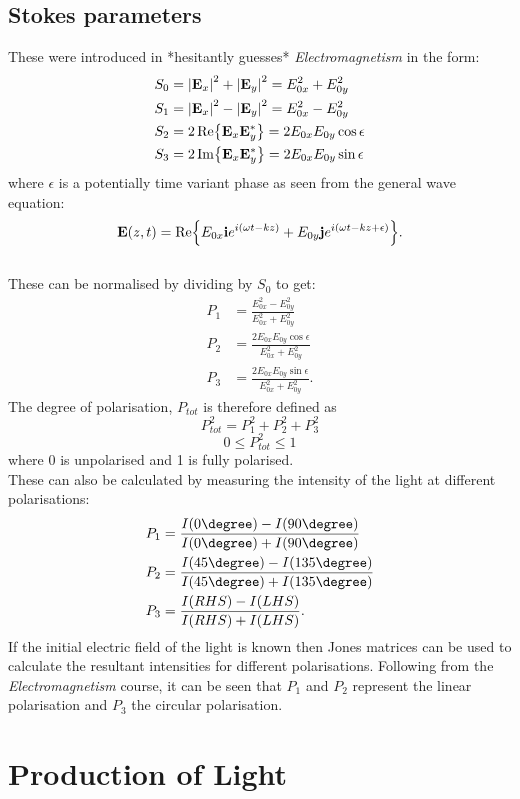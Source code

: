 \subsection{Stokes parameters}
These were introduced in *hesitantly guesses* \textit{Electromagnetism} in the form:
\begin{align*}
S_0 &= \abs{\vb{E}_x}^2 + \abs{\vb{E}_y}^2 = E_{0x}^2 + E_{0y}^2 \\
S_1 &= \abs{\vb{E}_x}^2 - \abs{\vb{E}_y}^2 =  E_{0x}^2 - E_{0y}^2 \\
S_2 &= 2\Re{\vb{E}_x\vb{E}_y^*} = 2E_{0x}E_{0y}\cos{\epsilon} \\
S_3 &= 2\Im{\vb{E}_x\vb{E}_y^*} = 2E_{0x}E_{0y}\sin{\epsilon}
\end{align*}
where \(\epsilon\) is a potentially time variant phase as seen from the general wave equation:
\begin{equation*}
\vb{E}(z,t) = \Re{E_{0x}\vb{i}e^{i(\omega{t} - kz)} + E_{0y}\vb{j}e^{i(\omega{t} - kz + \epsilon)}}.
\end{equation*}
\\
These can be normalised by dividing by \(S_0\) to get:
\begin{align*}
P_1 &= \frac{E_{0x}^2 - E_{0y}^2}{E_{0x}^2 + E_{0y}^2} \\
P_2 &= \frac{2E_{0x}E_{0y}\cos{\epsilon}}{E_{0x}^2 + E_{0y}^2} \\
P_3 &= \frac{2E_{0x}E_{0y}\sin{\epsilon}}{E_{0x}^2 + E_{0y}^2}.
\end{align*}
The degree of polarisation, \(P_{tot}\) is therefore defined as
\[P_{tot}^2 = P_{1}^2 + P_{2}^2 + P_{3}^2\] 
\[ 0 \leq P_{tot}^2 \leq 1\]
where 0 is unpolarised and 1 is fully polarised.
\\
These can also be calculated by measuring the intensity of the light at different polarisations:
\begin{align*}
P_1 &= \frac{I(0\degree) - I(90\degree)}{I(0\degree) + I(90\degree)} \\
P_2 &= \frac{I(45\degree) - I(135\degree)}{I(45\degree) + I(135\degree)} \\ 
P_3 &= \frac{I(RHS) - I(LHS)}{I(RHS) + I(LHS)}.
\end{align*}
If the initial electric field of the light is known then Jones matrices can be used to calculate the resultant intensities for different polarisations.
Following from the \textit{Electromagnetism} course, it can be seen that \(P_1\) and  \(P_2 \) represent the linear polarisation and \(P_3\) the circular polarisation.
\section{Production of Light}
